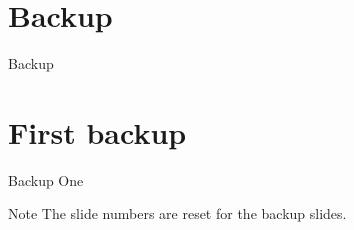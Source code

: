 \documentclass[10pt,aspectratio=1610]{beamer}
\begin{document}
\appendix

\section{Backup}
\begin{frame}[c]
  \begin{center}
    \Huge Backup
  \end{center}
\end{frame}

\section{First backup}
\begin{frame}{Backup One}
  \begin{alertblock}{Note}
    The slide numbers are reset for the backup slides.
  \end{alertblock}
\end{frame}
\end{document}

